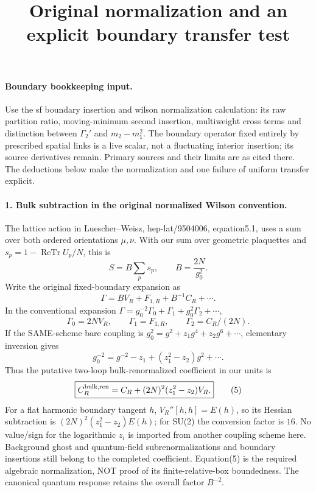 \documentclass[11pt]{article}
\title{Original normalization and an explicit boundary transfer test}\author{}\date{}
\begin{document}
\maketitle
\paragraph{Boundary bookkeeping input.}
Use the sf boundary insertion and wilson normalization calculation: its raw partition ratio, moving-minimum
second insertion, multiweight cross terms and distinction between
$\Gamma_2'$ and $m_2-m_1^2$. The boundary operator fixed
entirely by prescribed spatial links is a live scalar, not a fluctuating
interior insertion; its source derivatives remain.
Primary sources and their limits are as cited there. The deductions
below make the normalization and one failure of uniform transfer explicit.

\paragraph{1. Bulk subtraction in the original normalized Wilson convention.}
The lattice action in Luescher--Weisz, hep-lat/9504006, equation5.1,
uses a sum over both ordered orientations $\mu,\nu$. With our sum over
geometric plaquettes and $s_p=1-\operatorname{ReTr}U_p/N$, this is
\[
 S= B\sum_p s_p,\qquad B=\frac{2N}{g_0^2}.                    \tag{1}
\]
Write the original fixed-boundary expansion as
\[
 \Gamma=B V_R+F_{1,R}+B^{-1}C_R+\cdots .                      \tag{2}
\]
In the conventional expansion
$\Gamma=g_0^{-2}\Gamma_0+\Gamma_1+g_0^2\Gamma_2+\cdots$,
\[
 \Gamma_0=2N V_R,\qquad\Gamma_1=F_{1,R},\qquad
                         \Gamma_2=C_R/(2N).                 \tag{3}
\]
If the SAME-scheme bare coupling is
$g_0^2=g^2+z_1g^4+z_2g^6+\cdots$, elementary inversion gives
\[
 g_0^{-2}=g^{-2}-z_1+(z_1^2-z_2)g^2+\cdots .                 \tag{4}
\]
Thus the putative two-loop bulk-renormalized coefficient in our units is
\[
 \boxed{C_R^{\rm bulk,ren}
           =C_R+(2N)^2(z_1^2-z_2)V_R.}                       \tag{5}
\]
For a flat harmonic boundary tangent $h$, $V_R''[h,h]=E(h)$, so its
Hessian subtraction is $(2N)^2(z_1^2-z_2)E(h)$; for SU(2) the
conversion factor is $16$. No value/sign for the logarithmic $z_i$ is
imported from another coupling scheme here. Background ghost and
quantum-field subrenormalizations and boundary insertions still belong
to the completed coefficient. Equation(5) is the required algebraic
normalization, NOT proof of its finite-relative-box boundedness.
The canonical quantum response retains the overall factor $B^{-2}$.
\end{document}
